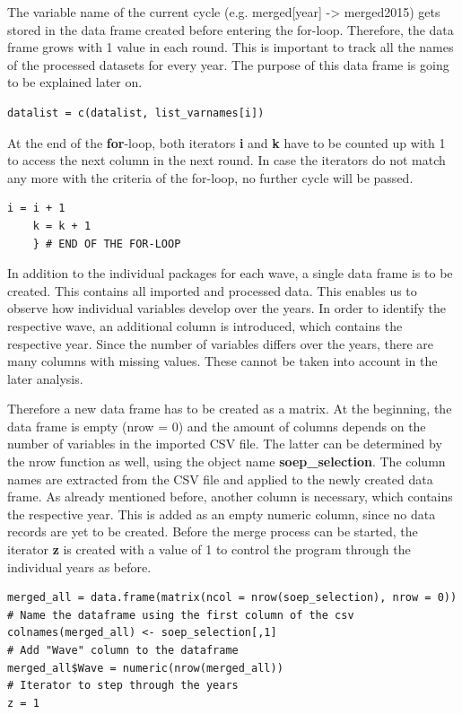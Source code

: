 \documentclass[a4paper]{article}
\begin{document}
The variable name of the current cycle (e.g. merged[year] -> merged2015) gets stored in the data frame created before entering the for-loop. Therefore, the data frame grows with 1 value in each round. This is important to track all the names of the processed datasets for every year. The purpose of this data frame is going to be explained later on.
\begin{lstlisting}[firstnumber=61]
    datalist = c(datalist, list_varnames[i])
\end{lstlisting}

At the end of the \textbf{for}-loop, both iterators \textbf{i} and \textbf{k} have to be counted up with 1 to access the next column in the next round. In case the iterators do not match any more with the criteria of the for-loop, no further cycle will be passed.
\begin{lstlisting}[firstnumber=63]
    i = i + 1
    k = k + 1
    } # END OF THE FOR-LOOP
\end{lstlisting}

In addition to the individual packages for each wave, a single data frame is to be created. This contains all imported and processed data. This enables us to observe how individual variables develop over the years. In order to identify the respective wave, an additional column is introduced, which contains the respective year. Since the number of variables differs over the years, there are many columns with missing values. These cannot be taken into account in the later analysis.

Therefore a new data frame has to be created as a matrix. At the beginning, the data frame is empty (nrow = 0) and the amount of columns depends on the number of variables in the imported CSV file. The latter can be determined by the nrow function as well, using the object name \textbf{soep\_selection}. The column names are extracted from the CSV file and applied to the newly created data frame. As already mentioned before, another column is necessary, which contains the respective year. This is added as an empty numeric column, since no data records are yet to be created. Before the merge process can be started, the iterator \textbf{z} is created with a value of 1 to control the program through the individual years as before.
\begin{lstlisting}[firstnumber=69]
merged_all = data.frame(matrix(ncol = nrow(soep_selection), nrow = 0))
# Name the dataframe using the first column of the csv
colnames(merged_all) <- soep_selection[,1]
# Add "Wave" column to the dataframe
merged_all$Wave = numeric(nrow(merged_all))
# Iterator to step through the years
z = 1
\end{lstlisting}
\end{document}
